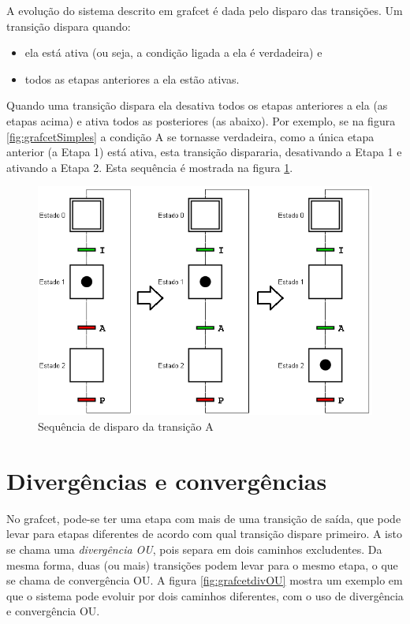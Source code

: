 A evolução do sistema descrito em grafcet é dada pelo disparo das transições. Um transição dispara quando:
\begin{itemize}
  \item ela está ativa (ou seja, a condição ligada a ela é verdadeira) e
  \item todos as etapas anteriores a ela estão ativas.
\end{itemize}

Quando uma transição dispara ela desativa todos os etapas anteriores a ela (as etapas acima) e ativa todos as posteriores (as abaixo). Por exemplo, se na figura \ref{fig:grafcetSimples} a condição A se tornasse verdadeira, como a única etapa anterior (a Etapa 1) está ativa, esta transição dispararia, desativando a Etapa 1 e ativando a Etapa 2. Esta sequência é mostrada na figura \ref{fig:grafcetDisparo}.
\begin{figure}[hbt]
  \centering
  \includegraphics[scale=0.6]{figuras/grafcetDisparo}
  \caption{Sequência de disparo da transição A}
  \label{fig:grafcetDisparo}
\end{figure}

\section{Divergências e convergências}

No grafcet, pode-se ter uma etapa com mais de uma transição de saída, que pode levar para etapas diferentes de acordo com qual transição dispare primeiro. A isto se chama uma \emph{divergência OU}, pois separa em dois caminhos excludentes. Da mesma forma, duas (ou mais) transições podem levar para o mesmo etapa, o que se chama de convergência OU. A figura \ref{fig:grafcetdivOU} mostra um exemplo em que o sistema pode evoluir por dois caminhos diferentes, com o uso de divergência e convergência OU.

